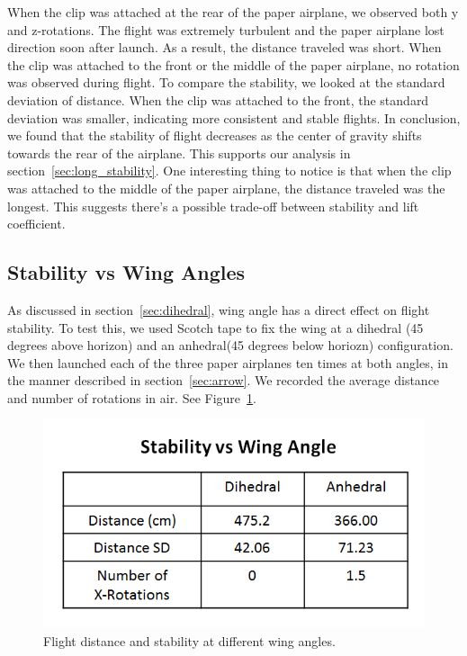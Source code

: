 When the clip was attached at the rear of the paper airplane, we observed both y and z-rotations. The flight was extremely turbulent and the paper airplane lost direction soon after launch. As a result, the distance traveled was short. When the clip was attached to the front or the middle of the paper airplane, no rotation was observed during flight. To compare the stability, we looked at the standard deviation of distance. When the clip was attached to the front, the standard deviation was smaller, indicating more consistent and stable flights. In conclusion, we found that the stability of flight decreases as the center of gravity shifts towards the rear of the airplane. This supports our analysis in section~\ref{sec:long_stability}. One interesting thing to notice is that when the clip was attached to the middle of the paper airplane, the distance traveled was the longest. This suggests there's a possible trade-off between stability and lift coefficient. 


\subsection{Stability vs Wing Angles}
As discussed in section~\ref{sec:dihedral}, wing angle has a direct effect on flight stability. To test this, we used Scotch tape to fix the wing at a dihedral (45 degrees above horizon) and an anhedral(45 degrees below horiozn) configuration. We then launched each of the three paper airplanes ten times at both angles, in the manner described in section~\ref{sec:arrow}. We recorded the average distance and number of rotations in air. See Figure~\ref{fig:angles}. 

\begin{figure}[hl]
	\centering
		\includegraphics[scale=0.5]{figures/angles.png}
		\caption{Flight distance and stability at different wing angles.}
	\label{fig:angles}
\end{figure}


